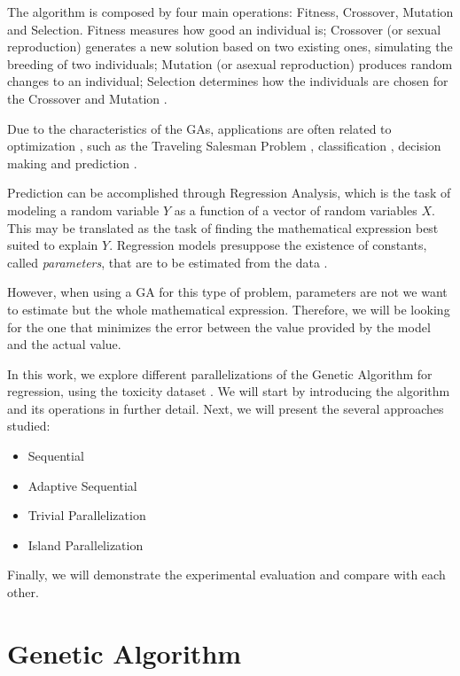 \documentclass[runningheads]{llncs}
\begin{document}
The algorithm is composed by four main operations: Fitness, Crossover, Mutation and Selection. Fitness measures how good an individual is; Crossover (or sexual reproduction) generates a new solution based on two existing ones, simulating the breeding of two individuals; Mutation (or asexual reproduction) produces random changes to an individual; Selection determines how the individuals are chosen for the Crossover and Mutation \cite{langdon1995genetic}.

Due to the characteristics of the GAs, applications are often related to optimization \cite{sivanandam2008genetic}, such as the Traveling Salesman Problem \cite{grefenstette1985genetic}, classification \cite{5340522}, decision making \cite{George:2012:GAB:2345396.2345426} and prediction \cite{etemadi2009genetic}.

Prediction can be accomplished through Regression Analysis, which is the task of modeling a random variable $Y$ as a function of a vector of random variables $X$. This may be translated as the task of finding the mathematical expression best suited to explain $Y$. Regression models presuppose the existence of constants, called \textit{parameters}, that are to be estimated from the data \cite{rawlings2001applied}.

However, when using a GA for this type of problem, parameters are not we want to estimate but the whole mathematical expression. Therefore, we will be looking for the one that minimizes the error between the value provided by the model and the actual value.

In this work, we explore different parallelizations of the Genetic Algorithm for regression, using the toxicity dataset \cite{krawiec2013genetic}. We will start by introducing the algorithm and its operations in further detail. Next, we will present the several approaches studied:

\begin{itemize}
\item Sequential
\item Adaptive Sequential
\item Trivial Parallelization
\item Island Parallelization
\end{itemize}

Finally, we will demonstrate the experimental evaluation and compare with each other.

\section{Genetic Algorithm}
\end{document}
